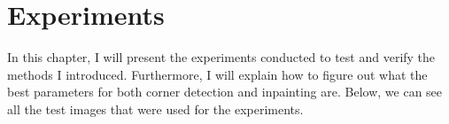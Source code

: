 \newcommand*{\addheight}[2][.5ex]{%
  \raisebox{0pt}[\dimexpr\height+(#1)\relax]{#2}%
}

\chapter{Experiments}\label{ch:Experiments} 
In this chapter, I will present the experiments conducted to test and verify the methods I
introduced. Furthermore, I will explain how to figure out what the best parameters for both corner detection and inpainting
are. Below, we can see all the test images that were used for the experiments.
\begin{figure}[h]
    \centering
    \\\vspace{0.2cm}

\end{figure}

